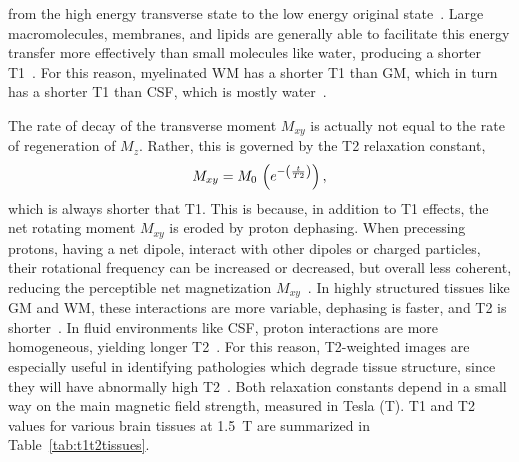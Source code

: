 from the high energy transverse state to the low energy original state~\cite{Bloch1946,Bryant2005}.
Large macromolecules, membranes, and lipids are generally able to facilitate this energy transfer
more effectively than small molecules like water, producing a shorter T1~\cite{Koenig1990}.
For this reason, myelinated WM has a shorter T1 than GM,
which in turn has a shorter T1 than CSF, which is mostly water~\cite{Roberts2007}.
\par
The rate of decay of the transverse moment $M_{xy}$
is actually not equal to the rate of regeneration of $M_z$.
Rather, this is governed by the T2 relaxation constant,
\begin{equation}
  M_{xy} = M_0\et\left(e^{-\left(\frac{t}{T2}\right)}\right),%
  \label{eq:T2}
\end{equation}
which is always shorter that T1.
This is because, in addition to T1 effects,
the net rotating moment $M_{xy}$ is eroded by proton dephasing.
When precessing protons, having a net dipole, interact with other dipoles or charged particles,
their rotational frequency can be increased or decreased, but overall less coherent,
reducing the perceptible net magnetization $M_{xy}$~\cite{Bloch1946}.
In highly structured tissues like GM and WM, these interactions are more variable,
dephasing is faster, and T2 is shorter~\cite{Roberts2007}.
In fluid environments like CSF, proton interactions are more homogeneous,
yielding longer T2~\cite{Roberts2007}.
For this reason, T2-weighted images are especially useful in identifying pathologies
which degrade tissue structure, since they will have abnormally high T2~\cite{Roberts2007}.
Both relaxation constants depend in a small way on the main magnetic field strength,
measured in Tesla (\si{\tesla}).
T1 and T2 values for various brain tissues at \SI{1.5}{\tesla}
are summarized in Table~\ref{tab:t1t2tissues}.
\par
\begin{table}
  \caption{T1 and T2 constants for brain tissues at 1.5 Tesla.}%
  \label{tab:t1t2tissues}
\end{table}
